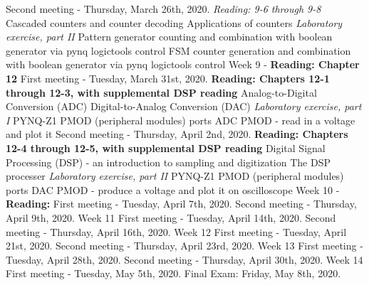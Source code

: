 \documentclass[10pt]{article}
\begin{document}
\begin{outline}[enumerate]
\2 Second meeting - Thursday, March 26th, 2020. \textit{Reading: 9-6 through 9-8}
\3 Cascaded counters and counter decoding
\3 Applications of counters
\3 \textit{Laboratory exercise, part II}
\4 Pattern generator counting and combination with boolean generator via pynq logictools control
\4 FSM counter generation and combination with boolean generator via pynq logictools control
\1 Week 9 - \textbf{Reading: Chapter 12}
\2 First meeting - Tuesday, March 31st, 2020. \textbf{Reading: Chapters 12-1 through 12-3, with supplemental DSP reading}
\3 Analog-to-Digital Conversion (ADC)
\3 Digital-to-Analog Conversion (DAC)
\3 \textit{Laboratory exercise, part I}
\4 PYNQ-Z1 PMOD (peripheral modules) ports
\4 ADC PMOD - read in a voltage and plot it
\2 Second meeting - Thursday, April 2nd, 2020. \textbf{Reading: Chapters 12-4 through 12-5, with supplemental DSP reading}
\3 Digital Signal Processing (DSP) - an introduction to sampling and digitization
\3 The DSP processer
\3 \textit{Laboratory exercise, part II}
\4 PYNQ-Z1 PMOD (peripheral modules) ports
\4 DAC PMOD - produce a voltage and plot it on oscilloscope
\1 Week 10 - \textbf{Reading: }
\2 First meeting - Tuesday, April 7th, 2020.
\2 Second meeting - Thursday, April 9th, 2020.
\1 Week 11
\2 First meeting - Tuesday, April 14th, 2020.
\2 Second meeting - Thursday, April 16th, 2020.
\1 Week 12
\2 First meeting - Tuesday, April 21st, 2020.
\2 Second meeting - Thursday, April 23rd, 2020.
\1 Week 13
\2 First meeting - Tuesday, April 28th, 2020.
\2 Second meeting - Thursday, April 30th, 2020.
\1 Week 14
\2 First meeting - Tuesday, May 5th, 2020.
\1 Final Exam: Friday, May 8th, 2020.
\end{outline}
\end{document}
